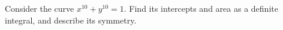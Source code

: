 Consider the curve $x^{10}+y^{10}=1$. Find its intercepts and area as a definite integral, and describe its symmetry.
